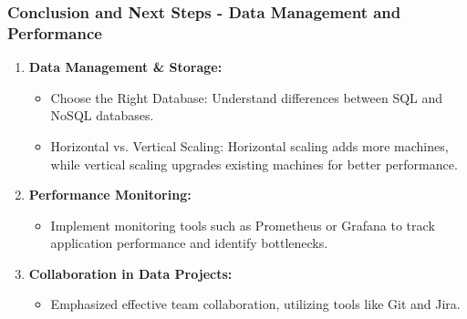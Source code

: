 \documentclass[aspectratio=169]{beamer}
\begin{document}
\begin{frame}[fragile]
    \frametitle{Conclusion and Next Steps - Data Management and Performance}
    
    \begin{enumerate}[resume]
        \item \textbf{Data Management \& Storage:}
        \begin{itemize}
            \item Choose the Right Database: Understand differences between SQL and NoSQL databases.
            \item Horizontal vs. Vertical Scaling: Horizontal scaling adds more machines, while vertical scaling upgrades existing machines for better performance.
        \end{itemize}

        \item \textbf{Performance Monitoring:}
        \begin{itemize}
            \item Implement monitoring tools such as Prometheus or Grafana to track application performance and identify bottlenecks.
        \end{itemize}

        \item \textbf{Collaboration in Data Projects:}
        \begin{itemize}
            \item Emphasized effective team collaboration, utilizing tools like Git and Jira.
        \end{itemize}
    \end{enumerate}
\end{frame}
\end{document}
